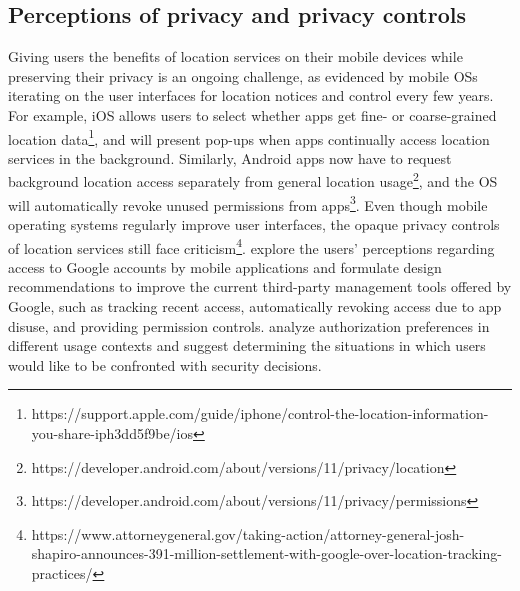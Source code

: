 \subsection{Perceptions of privacy and privacy controls}
\label{sec:relatedPerception}

Giving users the benefits of location services on their mobile devices while preserving their privacy is an ongoing challenge, as evidenced by mobile OSs iterating on the user interfaces for location notices and control every few years.
For example, iOS allows users to select whether apps get fine- or coarse-grained location data\footnote{https://support.apple.com/guide/iphone/control-the-location-information-you-share-iph3dd5f9be/ios}, and will
present pop-ups when apps continually access location services in the background.
Similarly, Android apps now have to request background location access separately from general location usage\footnote{https://developer.android.com/about/versions/11/privacy/location},
and the OS
 will automatically revoke unused permissions from apps\footnote{https://developer.android.com/about/versions/11/privacy/permissions}. 
Even though mobile operating systems regularly improve user interfaces, the opaque privacy controls of location services still face criticism\footnote{https://www.attorneygeneral.gov/taking-action/attorney-general-josh-shapiro-announces-391-million-settlement-with-google-over-location-tracking-practices/}.
\cite{277130} explore the users' perceptions regarding access to Google accounts by mobile applications and formulate design recommendations to improve the current third-party management tools offered by Google, such as tracking recent access, automatically revoking access due to app disuse, and providing permission controls.
\cite{190982} analyze authorization preferences in different usage contexts and suggest determining the situations in which users would like to be confronted with security decisions.








